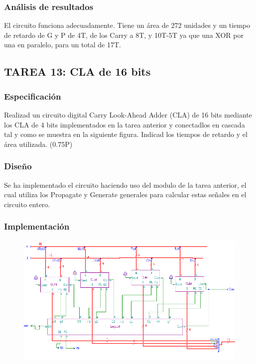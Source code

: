 \documentclass{article}
\begin{document}
		\subsubsection*{Análisis de resultados}
		El circuito funciona adecuadamente. Tiene un área de 272 unidades y un tiempo de retardo de G y P de 4T, de los Carry a 8T, y 10T-5T ya que una XOR por una en paralelo, para un total de 17T.


	\subsection{TAREA 13: CLA de 16 bits}
		\subsubsection*{Especificación}
Realizad un circuito digital Carry Look-Ahead Adder (CLA) de 16 bits mediante los
CLA de 4 bits implementados en la tarea anterior y conectadlos en cascada tal y como se muestra en
la siguiente figura. Indicad los tiempos de retardo y el área utilizada. (0.75P)


		\subsubsection*{Diseño}
		Se ha implementado el circuito haciendo uso del modulo de la tarea anterior, el cual utiliza los Propagate y Generate generales para calcular estas señales en el circuito entero.


		\subsubsection*{Implementación}
		 \begin{figure}[ht]
			\includegraphics[width=0.8\linewidth]{CLA16}
		 	\centering
		 \end{figure}
\end{document}
